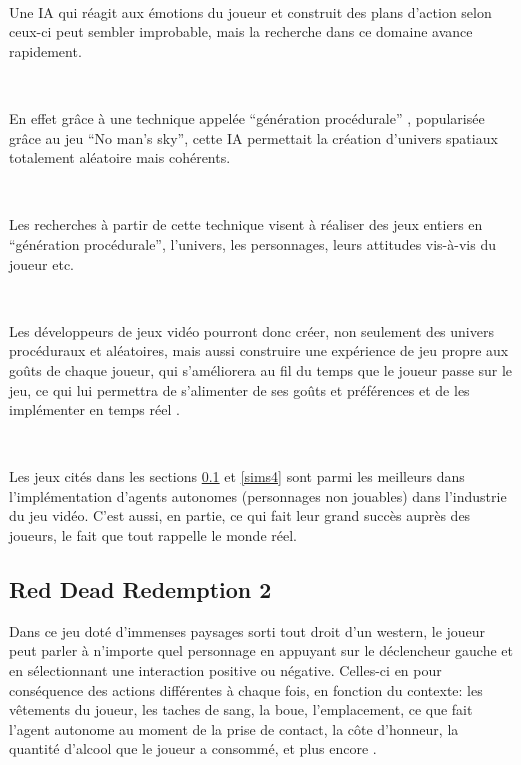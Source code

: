 ~\par
Une IA qui réagit aux émotions du joueur et construit des plans d’action selon ceux-ci peut sembler improbable, mais la recherche dans ce domaine avance rapidement.

~\par
En effet grâce à une technique appelée “génération procédurale” \parencite{generation}, popularisée grâce au jeu “No man’s sky”, cette IA permettait la création d’univers spatiaux totalement aléatoire mais cohérents.

~\par
Les recherches à partir de cette technique visent à réaliser des jeux entiers en “génération procédurale”, l’univers, les personnages, leurs attitudes vis-à-vis du joueur etc.

~\par
Les développeurs de jeux vidéo pourront donc créer, non seulement des univers procéduraux et aléatoires, mais aussi construire une expérience de jeu propre aux goûts de chaque joueur, qui s’améliorera au fil du temps que le joueur passe sur le jeu, ce qui lui permettra de s’alimenter de ses goûts et préférences et de les implémenter en temps réel \parencite{youtubeIA}.

~\par
Les jeux cités dans les sections \ref{red} et \ref{sims4} sont parmi les meilleurs dans l’implémentation d’agents autonomes (personnages non jouables) dans l’industrie du jeu vidéo. C’est aussi, en partie, ce qui fait leur grand succès auprès des joueurs, le fait que tout rappelle le monde réel.



\subsection{Red Dead Redemption 2}\label{red}

Dans ce jeu doté d’immenses paysages sorti tout droit d’un western, le joueur peut parler à n’importe quel personnage en appuyant sur le déclencheur gauche et en sélectionnant une interaction positive ou négative. Celles-ci en pour conséquence des actions différentes à chaque fois, en fonction du contexte: les vêtements du joueur, les taches de sang, la boue, l’emplacement, ce que fait l’agent autonome au moment de la prise de contact, la côte d’honneur, la quantité d’alcool que le joueur a consommé, et plus encore \parencite{red}.


